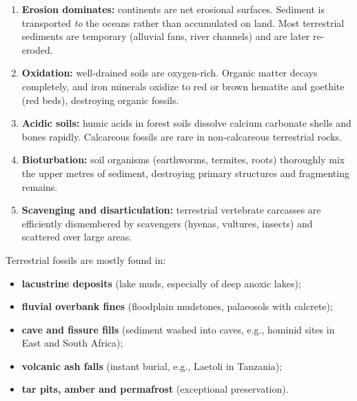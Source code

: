 \documentclass[11pt]{article}
\newcounter{popsec}
\newcounter{popsub}
\newcommand{\courssub}[1]{%
  \stepcounter{popsub}%
  \par\vspace{9pt}\noindent{\popxbold\fontsize{11.5}{13}\selectfont\color{popink}{\color{poporange}\thepopsec.\thepopsub}\hspace{6pt}#1}\par\nopagebreak\vspace{4pt}
}
\begin{document}
\begin{enumerate}
    \item \textbf{Erosion dominates:} continents are net erosional surfaces. Sediment is transported \emph{to} the oceans rather than accumulated on land. Most terrestrial sediments are temporary (alluvial fans, river channels) and are later re-eroded.
    \item \textbf{Oxidation:} well-drained soils are oxygen-rich. Organic matter decays completely, and iron minerals oxidize to red or brown hematite and goethite (red beds), destroying organic fossils.
    \item \textbf{Acidic soils:} humic acids in forest soils dissolve calcium carbonate shells and bones rapidly. Calcareous fossils are rare in non-calcareous terrestrial rocks.
    \item \textbf{Bioturbation:} soil organisms (earthworms, termites, roots) thoroughly mix the upper metres of sediment, destroying primary structures and fragmenting remains.
    \item \textbf{Scavenging and disarticulation:} terrestrial vertebrate carcasses are efficiently dismembered by scavengers (hyenas, vultures, insects) and scattered over large areas.
\end{enumerate}

\begin{aretenir}
Terrestrial fossils are mostly found in:
\begin{itemize}
    \item \textbf{lacustrine deposits} (lake muds, especially of deep anoxic lakes);
    \item \textbf{fluvial overbank fines} (floodplain mudstones, palaeosols with calcrete);
    \item \textbf{cave and fissure fills} (sediment washed into caves, e.g., hominid sites in East and South Africa);
    \item \textbf{volcanic ash falls} (instant burial, e.g., Laetoli in Tanzania);
    \item \textbf{tar pits, amber and permafrost} (exceptional preservation).
\end{itemize}
\end{aretenir}

\courssub{Illustrations}
\end{document}
